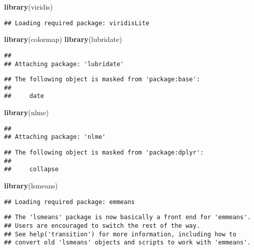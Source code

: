 \documentclass[]{article}
\newenvironment{Shaded}{\begin{snugshade}}{\end{snugshade}}
\newcommand{\KeywordTok}[1]{\textcolor[rgb]{0.13,0.29,0.53}{\textbf{#1}}}
\newcommand{\NormalTok}[1]{#1}
\begin{document}
\begin{Shaded}
\begin{Highlighting}[]
\KeywordTok{library}\NormalTok{(viridis)}
\end{Highlighting}
\end{Shaded}

\begin{verbatim}
## Loading required package: viridisLite
\end{verbatim}

\begin{Shaded}
\begin{Highlighting}[]
\KeywordTok{library}\NormalTok{(colormap)}
\KeywordTok{library}\NormalTok{(lubridate)}
\end{Highlighting}
\end{Shaded}

\begin{verbatim}
## 
## Attaching package: 'lubridate'
\end{verbatim}

\begin{verbatim}
## The following object is masked from 'package:base':
## 
##     date
\end{verbatim}

\begin{Shaded}
\begin{Highlighting}[]
\KeywordTok{library}\NormalTok{(nlme)}
\end{Highlighting}
\end{Shaded}

\begin{verbatim}
## 
## Attaching package: 'nlme'
\end{verbatim}

\begin{verbatim}
## The following object is masked from 'package:dplyr':
## 
##     collapse
\end{verbatim}

\begin{Shaded}
\begin{Highlighting}[]
\KeywordTok{library}\NormalTok{(lsmeans)}
\end{Highlighting}
\end{Shaded}

\begin{verbatim}
## Loading required package: emmeans
\end{verbatim}

\begin{verbatim}
## The 'lsmeans' package is now basically a front end for 'emmeans'.
## Users are encouraged to switch the rest of the way.
## See help('transition') for more information, including how to
## convert old 'lsmeans' objects and scripts to work with 'emmeans'.
\end{verbatim}
\end{document}

